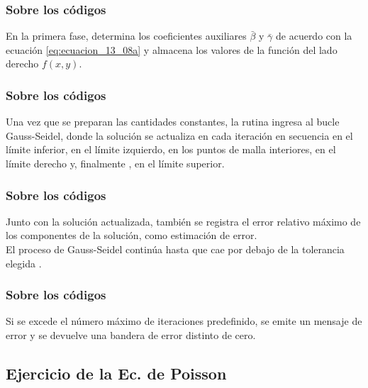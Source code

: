 \documentclass[12pt]{beamer}
\begin{document}
\begin{frame}
\frametitle{Sobre los códigos}
En la primera fase,  determina los coeficientes auxiliares $\bar{\beta}$ y $\bar{\gamma}$ de acuerdo con la ecuación \ref{eq:ecuacion_13_08a} y almacena los valores de la función del lado derecho $f (x, y)$.
\end{frame}
\begin{frame}
\frametitle{Sobre los códigos}
Una vez que se preparan las cantidades constantes, la rutina ingresa al bucle Gauss-Seidel, donde la solución se actualiza en cada iteración en secuencia en el límite inferior, en el límite izquierdo, en los puntos de malla interiores, en el límite derecho y, finalmente , en el límite superior.
\end{frame}
\begin{frame}
\frametitle{Sobre los códigos}
Junto con la solución actualizada, también se registra el error relativo máximo de los componentes de la solución, como estimación de error.
\\
\bigskip
\pause
El proceso de Gauss-Seidel continúa hasta que  cae por debajo de la tolerancia elegida .
\end{frame}
\begin{frame}
\frametitle{Sobre los códigos}
Si se excede el número máximo de iteraciones predefinido, se emite un mensaje de error y se devuelve una bandera de error distinto de cero.
\end{frame}

\subsection{Ejercicio de la Ec. de Poisson}
\end{document}
